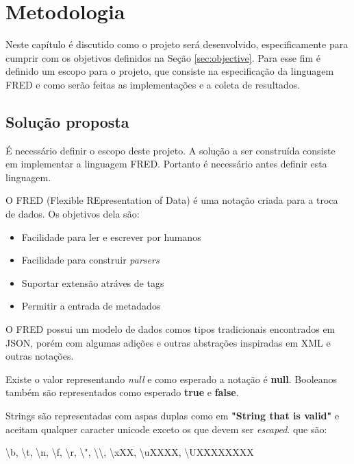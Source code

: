 \chapter[Metodologia]{Metodologia}

Neste capítulo é discutido como o projeto será desenvolvido, especificamente
para cumprir com os objetivos definidos na Seção \ref{sec:objective}. Para esse fim
é definido um escopo para o projeto, que consiste na especificação da linguagem FRED e 
como serão feitas as implementações e a coleta de resultados.

\section{Solução proposta}
\label{sec:solution}

É necessário definir o escopo deste projeto. A solução a ser construída consiste em implementar a linguagem FRED.
Portanto é necessário antes definir esta linguagem.

O FRED (Flexible REpresentation of Data) é uma notação criada para a troca de dados. Os
objetivos dela são:

\begin{itemize}
    \item Facilidade para ler e escrever por humanos
    \item Facilidade para construir \textit{parsers}
    \item Suportar extensão atráves de tags
    \item Permitir a entrada de metadados
\end{itemize}

O FRED possui um modelo de dados comos tipos tradicionais encontrados em JSON, 
porém com algumas adições e outras abstrações inspiradas em XML e outras notações.

Existe o valor representando \textit{null} e como esperado a notação é  \textbf{null}. Booleanos
também são representados como esperado \textbf{true} e \textbf{false}.

Strings são representadas com aspas duplas como em \textbf{"String that is valid"} 
e aceitam qualquer caracter unicode exceto os que devem ser \textit{escaped}.  
que são:

\begin{center}    
    \textbackslash b, \textbackslash t, \textbackslash n, \textbackslash f, 
    \textbackslash r, \textbackslash ", \textbackslash \textbackslash , \textbackslash xXX, 
    \textbackslash uXXXX, \textbackslash UXXXXXXXX
\end{center}

